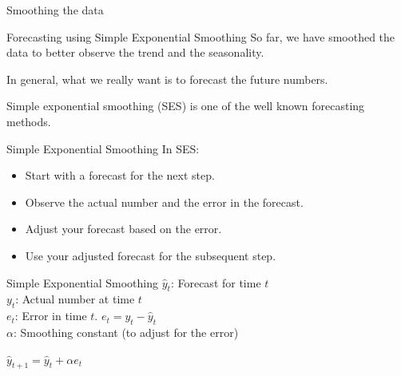 \documentclass{beamer}\usepackage[]{graphicx}\usepackage[]{color}
\newenvironment{knitrout}{}{} %
\begin{document}
\begin{darkframes}
\begin{frame}[fragile]{Smoothing the data}
\begin{knitrout}
\end{knitrout}
  
    \end{frame}
    
    
    \begin{frame}[fragile]{Forecasting using Simple Exponential Smoothing}
      \fontsize{9}{9}\selectfont
        So far, we have smoothed the data to better observe the trend and the seasonality.
        \bigskip
        
        In general, what we really want is to forecast the future numbers.
        \bigskip
        
        Simple exponential smoothing (SES) is one of the well known forecasting methods.
  
    \end{frame}
    
    
    
    \begin{frame}[fragile]{Simple Exponential Smoothing}
     \fontsize{9}{9}\selectfont
      In SES:
      
      \begin{itemize}[<+->]
        \item Start with a forecast for the next step.
        \item Observe the actual number and the error in the forecast.
        \item Adjust your forecast based on the error.
        \item Use your adjusted forecast for the subsequent step.
     \end{itemize}

    \end{frame}
    
    
    
    \begin{frame}[fragile]{Simple Exponential Smoothing}
     \fontsize{9}{9}\selectfont
      $\hat{y}_t$: Forecast for time $t$ \\
      $y_t$: Actual number at time $t$ \\ 
      $e_t$: Error in time $t$. $e_t = y_t - \hat{y}_t$ \\
      $\alpha$: Smoothing constant (to adjust for the error)
      \bigskip
      
      \begin{center}
          $ \hat{y}_{t+1} = \hat{y}_t + \alpha e_t $ \\ \bigskip
          

\end{center}
\end{frame}
\end{darkframes}
\end{document}
